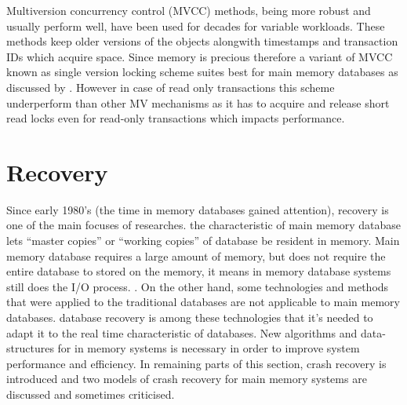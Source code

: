 \documentclass[12pt]{article} %
\begin{document}
Multiversion concurrency control (MVCC) methods, being more robust and usually perform well, have been used for decades for variable workloads. These methods keep older versions of the objects alongwith timestamps and transaction IDs which acquire space. Since memory is precious therefore a variant of MVCC known as single version locking scheme suites best for main memory databases as discussed by \cite{larson2011high}. However in case of read only transactions this scheme underperform than other MV mechanisms as it has to acquire and release short read locks even for read-only transactions which impacts performance.





\section{Recovery}

Since early 1980’s (the time in memory databases gained attention), recovery is one of the main focuses of researches.  the characteristic of main memory database lets ``master copies'' or ``working copies'' of database be resident in memory. Main memory database requires a large amount of memory, but does not require the entire database to stored on the memory, it means in memory database systems still does the I/O process.  \cite{liangcheckpointing}. On the other hand, some technologies and methods that were applied to the traditional databases are not applicable to main memory databases. database recovery is among these technologies that it's needed to adapt it to the real time characteristic of databases. New algorithms and data-structures for in memory systems is necessary in order to improve system performance and efficiency. In remaining parts of this section, crash recovery is introduced and two models of crash recovery for main memory systems are discussed and sometimes criticised.
\end{document}
